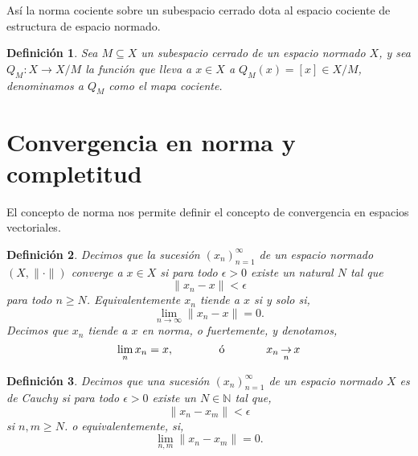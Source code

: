\documentclass[12pt]{book}
\newtheorem{defn}{\bf Definición}[chapter]
\begin{document}
 
  Así la  norma cociente sobre un subespacio cerrado dota  al espacio cociente de estructura de 
espacio normado.
  
  \begin{defn}  Sea $M\subseteq X$ un subespacio  cerrado de un espacio normado $X$, y sea 
$Q_M:X\longrightarrow X/M$ la función que lleva a $x\in X$ a $Q_M(x)=[x]\in X/M$, denominamos 
a  $Q_M$ como el mapa cociente.
  \end{defn}
 

\section{Convergencia en norma y completitud}

 El concepto de norma nos permite definir el concepto de convergencia en espacios vectoriales.
 

\begin{defn} Decimos que la sucesión  $(x_n)_{n=1}^\infty$ de un espacio normado $(X,\lVert 
\cdot\rVert)$ converge a $x\in X$ si para todo $\epsilon>0$ existe un natural $N$ tal que  
$$\lVert x_n - x\rVert<\epsilon$$
para todo $n\geq N$. Equivalentemente $x_n$ tiende a $x$ si y solo si, 
$$\lim_{n\to\infty}\lVert x_n-x\rVert=0.$$
Decimos que $x_n$ tiende a $x$ {\it en norma}, o {\it fuertemente}, y denotamos,
$$\lim_n x_n=x,\hspace{1.3cm}\textrm{ ó}\hspace{1.3cm} x_n\mathop{\to}_n x$$
\end{defn}

\begin{defn} Decimos que una sucesión $(x_n)_{n=1}^\infty$ de un espacio normado $X$ es de 
Cauchy si para todo $\epsilon>0$ existe un $N\in\mathbb{N}$ tal que,
$$\lVert x_n-x_m\rVert<\epsilon$$
 si $n,m\geq N$. o equivalentemente, si, 
 $$\lim_{n,m}\lVert x_n-x_m\rVert=0.$$
 \end{defn}
 
\end{document}
